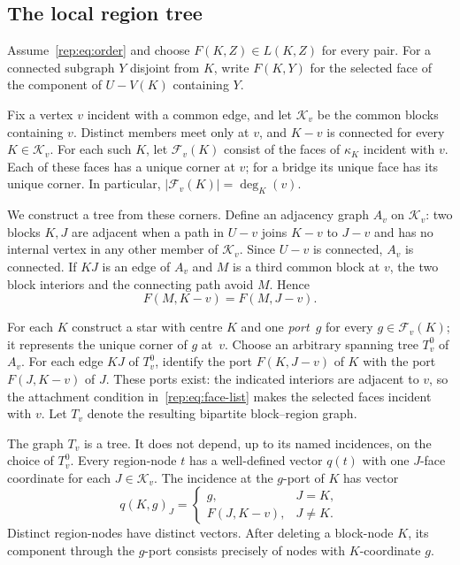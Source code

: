 \subsection{The local region tree}
\label{rep:signature-tree}

Assume~\eqref{rep:eq:order} and choose $F(K,Z)\in L(K,Z)$ for every pair.
For a connected subgraph $Y$ disjoint from $K$, write $F(K,Y)$ for the
selected face of the component of $U-V(K)$ containing $Y$.

Fix a vertex $v$ incident with a common edge, and let $\mathcal K_v$ be
the common blocks containing $v$.  Distinct members meet only at $v$,
and $K-v$ is connected for every $K\in\mathcal K_v$.  For each such $K$,
let $\mathcal F_v(K)$ consist of the faces of $\kappa_K$ incident with $v$.
Each of these faces has a unique corner at $v$; for a bridge its unique
face has its unique corner.  In particular,
$|\mathcal F_v(K)|=\deg_K(v)$.

We construct a tree from these corners.  Define an adjacency graph $A_v$
on $\mathcal K_v$: two blocks $K,J$ are adjacent when a path in $U-v$
joins $K-v$ to $J-v$ and has no internal vertex in any other member of
$\mathcal K_v$.  Since $U-v$ is connected, $A_v$ is connected.  If $KJ$
is an edge of $A_v$ and $M$ is a third common block at $v$, the two
block interiors and the connecting path avoid $M$.  Hence
\begin{equation}\label{rep:eq:adjacent-face}
 F(M,K-v)=F(M,J-v).
\end{equation}

For each $K$ construct a star with centre $K$ and one \emph{port}~$g$
for every $g\in\mathcal F_v(K)$; it represents the unique corner of $g$
at~$v$.  Choose an arbitrary spanning tree
$T^0_v$ of $A_v$.  For each edge $KJ$ of $T^0_v$, identify the port
$F(K,J-v)$ of $K$ with the port $F(J,K-v)$ of $J$.  These ports exist:
the indicated interiors are adjacent to $v$, so the attachment condition
in~\eqref{rep:eq:face-list} makes the selected faces incident with $v$.
Let $T_v$ denote the resulting bipartite block--region graph.

\begin{lemma}
\label{rep:lem:signature-tree}
The graph $T_v$ is a tree.  It does not depend, up to its named
incidences, on the choice of $T^0_v$.  Every region-node $t$ has a
well-defined vector $q(t)$ with one $J$-face coordinate for each
$J\in\mathcal K_v$.  The incidence at the $g$-port of $K$ has vector
\begin{equation}\label{rep:eq:signature}
 q(K,g)_J=\begin{cases}
          g,&J=K,\\
          F(J,K-v),&J\ne K.
         \end{cases}
\end{equation}
Distinct region-nodes have distinct vectors.  After deleting a block-node
$K$, its component through the $g$-port consists precisely of nodes with
$K$-coordinate $g$.
\end{lemma}

